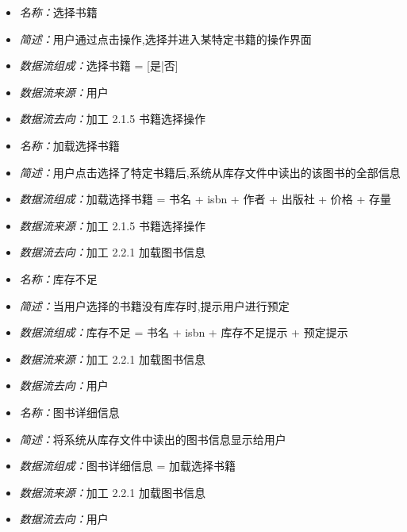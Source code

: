 \vspace{-1mm}

\begin{itemize}
	\item \textit{名称：}选择书籍
	\item \textit{简述：}用户通过点击操作,选择并进入某特定书籍的操作界面
	\item \textit{数据流组成：}选择书籍 = [是|否]
	\item \textit{数据流来源：}用户
	\item \textit{数据流去向：}加工 2.1.5 书籍选择操作
\end{itemize}

\vspace{-1mm}

\begin{itemize}
	\item \textit{名称：}加载选择书籍
	\item \textit{简述：}用户点击选择了特定书籍后,系统从库存文件中读出的该图书的全部信息
	\item \textit{数据流组成：}加载选择书籍 = 书名 + isbn + 作者 + 出版社 + 价格 + 存量
	\item \textit{数据流来源：}加工 2.1.5 书籍选择操作
	\item \textit{数据流去向：}加工 2.2.1 加载图书信息
\end{itemize}

\vspace{-1mm}

\begin{itemize}
	\item \textit{名称：}库存不足
	\item \textit{简述：}当用户选择的书籍没有库存时,提示用户进行预定
	\item \textit{数据流组成：}库存不足 = 书名 + isbn + 库存不足提示 + 预定提示
	\item \textit{数据流来源：}加工 2.2.1 加载图书信息
	\item \textit{数据流去向：}用户
\end{itemize}

\vspace{-1mm}

\begin{itemize}
	\item \textit{名称：}图书详细信息
	\item \textit{简述：}将系统从库存文件中读出的图书信息显示给用户
	\item \textit{数据流组成：}图书详细信息 = 加载选择书籍
	\item \textit{数据流来源：}加工 2.2.1 加载图书信息
	\item \textit{数据流去向：}用户
\end{itemize}

